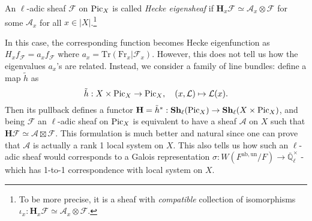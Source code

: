 \begin{definition} An $\ell$-adic sheaf $\mathcal{F}$ on $\operatorname{\mathrm{Pic}}_X$ is called \emph{Hecke eigensheaf} if
$\mathbf{H}_{x}\mathcal{F} \simeq \mathcal{A}_{x} \otimes \mathcal{F}$ for some $\mathcal{A}_{x}$ for all $x\in |X|$.\footnote{To be more precise, it is a sheaf with \emph{compatible} collection of isomorphisms $\iota_{x}: \mathbf{H}_{x}\mathcal{F} \simeq \mathcal{A}_{x}\otimes \mathcal{F}$.}
\end{definition}
In this case, the corresponding function becomes Hecke eigenfunction as $H_{x}f_{\mathcal{F}} = a_{x}f_{\mathcal{F}}$ where $a_{x} = \mathrm{Tr}(\mathrm{Fr}_{x}|\mathcal{F}_x)$.
However, this does not tell us how the eigenvalues $a_{x}$'s are related.
Instead, we consider a family of line bundles: define a map $\tilde{h}$ as 
$$
\tilde{h}: X \times \operatorname{\mathrm{Pic}}_X \to \operatorname{\mathrm{Pic}}_X, \quad (x, \mathcal{L}) \mapsto \mathcal{L}(x).
$$
Then its pullback defines a functor $\mathbf{H} = \tilde{h}^{*}: \mathbf{Sh}_{\ell}(\operatorname{\mathrm{Pic}}_X) \to \mathbf{Sh}_{\ell}(X \times \operatorname{\mathrm{Pic}}_X)$, and being $\mathcal{F}$ an $\ell$-adic sheaf
on $\operatorname{\mathrm{Pic}}_X$ is equivalent to have a sheaf $\mathcal{A}$ on $X$ such that $\mathbf{H}\mathcal{F} \simeq \mathcal{A} \boxtimes \mathcal{F}$.
This formulation is much better and natural since one can prove that $\mathcal{A}$ is actually a rank 1 local system on $X$.
This also tells us how such an $\ell$-adic sheaf would corresponds to a Galois representation
$\sigma: W(F^{\mathrm{ab, un}}/F) \to \overline{\mathbb{Q}}_{\ell}^{\times}$ - which has 1-to-1 correspondence with local system on $X$.

